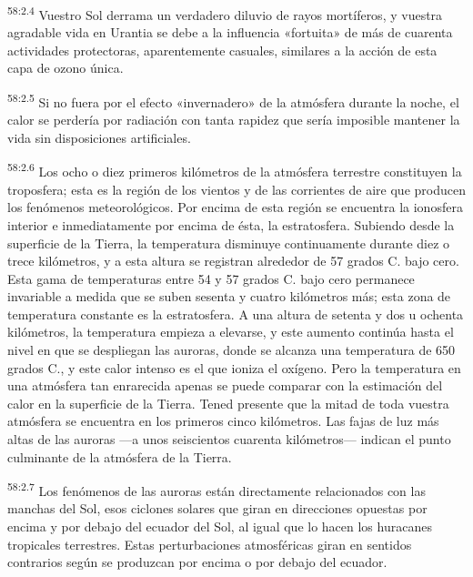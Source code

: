 \par
\textsuperscript{58:2.4} Vuestro Sol derrama un verdadero diluvio de rayos mortíferos, y vuestra agradable vida en Urantia se debe a la influencia «fortuita» de más de cuarenta actividades protectoras, aparentemente casuales, similares a la acción de esta capa de ozono única.

\par
\textsuperscript{58:2.5} Si no fuera por el efecto «invernadero» de la atmósfera durante la noche, el calor se perdería por radiación con tanta rapidez que sería imposible mantener la vida sin disposiciones artificiales.

\par
\textsuperscript{58:2.6} Los ocho o diez primeros kilómetros de la atmósfera terrestre constituyen la troposfera; esta es la región de los vientos y de las corrientes de aire que producen los fenómenos meteorológicos. Por encima de esta región se encuentra la ionosfera interior e inmediatamente por encima de ésta, la estratosfera. Subiendo desde la superficie de la Tierra, la temperatura disminuye continuamente durante diez o trece kilómetros, y a esta altura se registran alrededor de 57 grados C. bajo cero. Esta gama de temperaturas entre 54 y 57 grados C. bajo cero permanece invariable a medida que se suben sesenta y cuatro kilómetros más; esta zona de temperatura constante es la estratosfera. A una altura de setenta y dos u ochenta kilómetros, la temperatura empieza a elevarse, y este aumento continúa hasta el nivel en que se despliegan las auroras, donde se alcanza una temperatura de 650 grados C., y este calor intenso es el que ioniza el oxígeno. Pero la temperatura en una atmósfera tan enrarecida apenas se puede comparar con la estimación del calor en la superficie de la Tierra. Tened presente que la mitad de toda vuestra atmósfera se encuentra en los primeros cinco kilómetros. Las fajas de luz más altas de las auroras ---a unos seiscientos cuarenta kilómetros--- indican el punto culminante de la atmósfera de la Tierra.

\par
\textsuperscript{58:2.7} Los fenómenos de las auroras están directamente relacionados con las manchas del Sol, esos ciclones solares que giran en direcciones opuestas por encima y por debajo del ecuador del Sol, al igual que lo hacen los huracanes tropicales terrestres. Estas perturbaciones atmosféricas giran en sentidos contrarios según se produzcan por encima o por debajo del ecuador.


